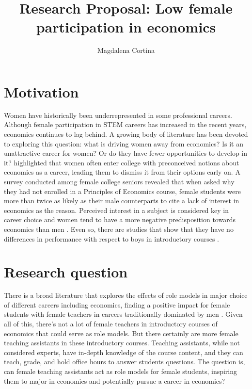 \documentclass[12pt]{article}
\title{\textbf{Research Proposal: Low female participation in economics}\\[-3em]}
\author{Magdalena Cortina}
\date{}
\begin{document}
\maketitle
\vspace{-7em} 



\section{Motivation}
Women have historically been underrepresented in some professional careers. Although
female participation in STEM careers has increased in the recent years, economics continues to lag
behind. 
A growing body of literature has been devoted to exploring this question: what is driving women away from economics? Is it an unattractive career for women? Or do they have fewer opportunities to develop in it? \citet{Dynan1997} highlighted that women often enter college with preconceived notions about economics as a career, leading them to dismiss it from their options early on. A survey conducted among female college seniors revealed that when asked why they had not enrolled in a Principles of Economics course, female students were more than twice as likely as their male counterparts to cite a lack of interest in economics as the reason. Perceived interest in a subject is considered key in career choice \citep{Calkins2006} and women tend to have a more negative predisposition towards economics than men \citep{Bansak2010}. Even so, there are studies that show that they have no differences in performance with respect to boys in introductory courses \citep{Bollinger2009}.


\section{Research question}
There is a broad literature that explores the effects of role models in major choice of different careers including economics, finding a positive impact for female students with female teachers in careers traditionally dominated by men \citep{Bettinger2005, Dynan1997, Neumark1998, Paredes2014, Carrell2010, Breda2020}. Given all of this, there's not a lot of female teachers in introductory courses of economics that could serve as role models. But there certainly are more female teaching assistants in these introductory courses. Teaching assistants, while not considered experts, have in-depth knowledge of the course content, and they can teach, grade, and hold office hours to answer students questions. The question is, can female teaching assistants act as role models for female students, inspiring them to major in economics and potentially pursue a career in economics?
\end{document}
